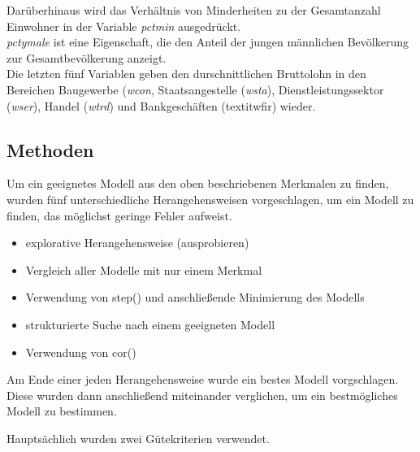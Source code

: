 Darüberhinaus wird das Verh\"altnis von Minderheiten zu der Gesamtanzahl Einwohner in der Variable \textit{pctmin} ausgedrückt. \\
\textit{pctymale} ist eine Eigenschaft, die den Anteil der jungen m\"annlichen Bev\"olkerung zur Gesamtbev\"olkerung anzeigt. \\
Die letzten f\"unf Variablen geben den durschnittlichen Bruttolohn in den Bereichen Baugewerbe (\textit{wcon}, Staatsangestelle (\textit{wsta}), Dienstleistungssektor (\textit{wser}), Handel (\textit{wtrd}) und Bankgesch\"aften (textit{wfir}) wieder. \\


\subsection{Methoden}
Um ein geeignetes Modell aus den oben beschriebenen Merkmalen zu finden, wurden f\"unf unterschiedliche Herangehensweisen vorgeschlagen, um ein Modell zu finden, das möglichst geringe Fehler aufweist.
\begin{itemize}
	\item explorative Herangehensweise (ausprobieren)
	\item Vergleich aller Modelle mit nur einem Merkmal
	\item Verwendung von step() und anschließende Minimierung des Modells
	\item strukturierte Suche nach einem geeigneten Modell
	\item Verwendung von cor()
\end{itemize}
Am Ende einer jeden Herangehensweise wurde ein bestes Modell vorgschlagen. Diese wurden dann anschließend miteinander verglichen, um ein bestmögliches Modell zu bestimmen.
\par\smallskip

\noindent
Haupts\"achlich wurden zwei G\"utekriterien verwendet.
\par\smallskip

